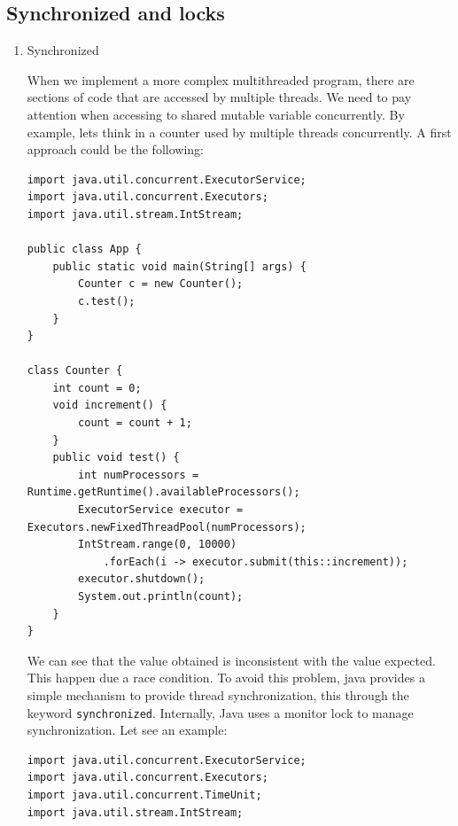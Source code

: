 \documentclass{latex/classes/thesis}
\begin{document}
\subsection{Synchronized and locks}
\label{sec:org0a0238b}


\begin{enumerate}
\item Synchronized
\label{sec:org16e62ad}

When we implement a more complex multithreaded program, there are sections
of code that are accessed by multiple threads. We need to pay attention when
accessing to shared mutable variable concurrently. By example, lets think in
a counter used by multiple threads concurrently. A first approach could be
the following:

\begin{lstlisting}
import java.util.concurrent.ExecutorService;
import java.util.concurrent.Executors;
import java.util.stream.IntStream;

public class App {
    public static void main(String[] args) {
        Counter c = new Counter();
        c.test();
    }
}

class Counter {
    int count = 0;
    void increment() {
        count = count + 1;
    }
    public void test() {
        int numProcessors = Runtime.getRuntime().availableProcessors();
        ExecutorService executor = Executors.newFixedThreadPool(numProcessors);
        IntStream.range(0, 10000)
            .forEach(i -> executor.submit(this::increment));
        executor.shutdown();
        System.out.println(count);
    }
}
\end{lstlisting}

We can see that the value obtained is inconsistent with the value
expected. This happen due a race condition.  To avoid this problem, java
provides a simple mechanism to provide thread synchronization, this through
the keyword \texttt{synchronized}. Internally, Java uses a monitor lock to manage
synchronization. Let see an example:

\begin{lstlisting}
import java.util.concurrent.ExecutorService;
import java.util.concurrent.Executors;
import java.util.concurrent.TimeUnit;
import java.util.stream.IntStream;


\end{lstlisting}
\end{enumerate}
\end{document}
